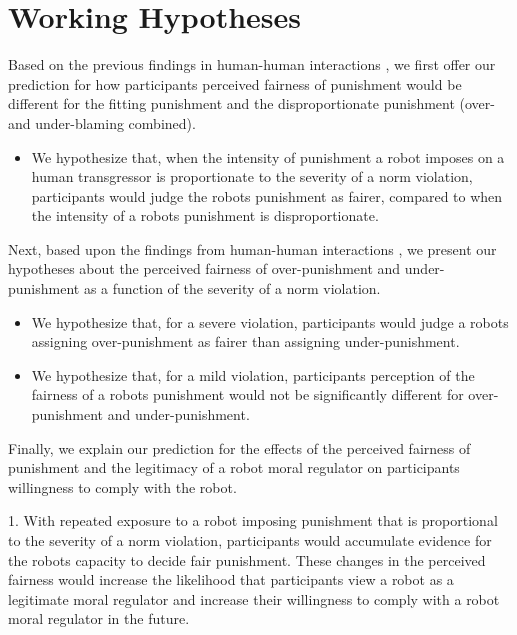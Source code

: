 \documentclass{article} %
\begin{document}
\section{Working Hypotheses}
Based on the previous findings in human-human interactions \cite{miller1981social,hogan1981retributive,ball1994just}, we first offer our prediction for how participants perceived fairness of punishment would be different for the fitting punishment and the disproportionate punishment (over- and under-blaming combined).
\begin{itemize}
\item We hypothesize that, when the intensity of punishment a robot imposes on a human transgressor is proportionate to the severity of a norm violation, participants would judge the robots punishment as fairer, compared to when the intensity of a robots punishment is disproportionate.
\end{itemize}

Next, based upon the findings from human-human interactions \cite{wagstaff1997overpunishment}, we present our hypotheses about the perceived fairness of over-punishment and under-punishment as a function of the severity of a norm violation.
\begin{itemize}
\item We hypothesize that, for a severe violation, participants would judge a robots assigning over-punishment as fairer than assigning under-punishment.
\item We hypothesize that, for a mild violation, participants perception of the fairness of a robots punishment would not be significantly different for over-punishment and under-punishment.
\end{itemize}

Finally, we explain our prediction for the effects of the perceived fairness of punishment and the legitimacy of a robot moral regulator on participants willingness to comply with the robot.
\begin{itemize}
1. With repeated exposure to a robot imposing punishment that is proportional to the severity of a norm violation, participants would accumulate evidence for the robots capacity to decide fair punishment. These changes in the perceived fairness would increase the likelihood that participants view a robot as a legitimate moral regulator and increase their willingness to comply with a robot moral regulator in the future.
\end{itemize}

\vspace{-2.36mm}
\end{document}
